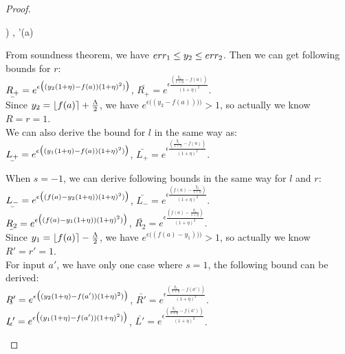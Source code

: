 \documentclass[a4paper,11pt]{article}
\begin{document}
\begin{proof}
\begin{itemize}
\begin{mathpar}
{{{{			\bigg)
		   }
		   {
		   \trsenv, \snap'(a) \trsto 
		   }
		  }
		 }
		}
		\end{mathpar}
		From soundness theorem, we have  $err_1 \leq y_2 \leq err_2$. Then we can get following bounds for $r$:\\
		$\ubar{R_+} = e^{\epsilon 
				\big( (y_2(1 + \eta) - f(a)) (1 + \eta)^2) \big)}$, 
		$\bar{R_+} = e^{\epsilon 
				\frac{(\frac{y_2}{1 + \eta} - f(a))}{(1 + \eta)^2}}$.  
		\\
		Since $y_2 = \lfloor f(a) \rceil + \frac{\Lambda}{2}$, we have $e^{\epsilon 
				\big( (y_2 - f(a))) \big)} > 1$, so actually we know $R = r = 1$.
		\\
		We can also derive the bound for $l$ in the same way as:\\
		$\ubar{L_+} = e^{\epsilon 
				\big( (y_1(1 + \eta) - f(a)) (1 + \eta)^2) \big)}$, 
		$\bar{L_+} = e^{\epsilon 
				\frac{(\frac{y_1}{1 + \eta} - f(a))}{(1 + \eta)^2}}$.

		When $s = -1$, we can derive following bounds in the same way for $l$ and $r$:\\
		$\ubar{L_-} = e^{\epsilon 
				\big( (f(a) - y_2(1 + \eta)) (1 + \eta)^2) \big)}$,
		$\bar{L_-} = e^{\epsilon 
				\frac{(f(a) - \frac{y_2}{1 + \eta})}{(1 + \eta)^2}}$.\\
		$\ubar{R_2} = e^{\epsilon 
				\big( (f(a) - y_1(1 + \eta)) (1 + \eta)^2) \big)}$, 
		$\bar{R_2} = e^{\epsilon 
				\frac{(f(a) - \frac{y_1}{1 + \eta})}{(1 + \eta)^2}}$.\\
		Since $y_1 = \lfloor f(a) \rceil - \frac{\Lambda}{2}$, 
		we have $e^{\epsilon \big( (f(a) - y_1)) \big)} > 1$, so actually we know $R' = r' = 1$.
		\\
		For input $a'$, we have only one case where $s = 1$, the following bound can be derived:
		\\
		$\ubar{R'} = e^{\epsilon 
				\big( (y_2(1 + \eta) - f(a')) (1 + \eta)^2) \big)}$, 
		$\bar{R'} = e^{\epsilon 
				\frac{(\frac{y_2}{1 + \eta} - f(a'))}{(1 + \eta)^2}}$.  
		\\
		$\ubar{L'} = e^{\epsilon 
				\big( (y_1(1 + \eta) - f(a')) (1 + \eta)^2) \big)}$, 
		$\bar{L'} = e^{\epsilon 
				\frac{(\frac{y_1}{1 + \eta} - f(a'))}{(1 + \eta)^2}}$.



\end{itemize}
\end{proof}
\end{document}
